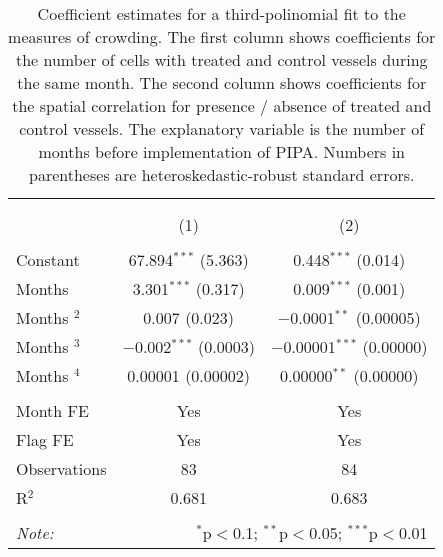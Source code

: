 
\begin{table}[!htbp] \centering 
  \caption{\label{tab:sp_corr}Coefficient estimates for a third-polinomial fit to the measures of crowding. The first column shows coefficients for the number of cells with treated and control vessels during the same month. The second column shows coefficients for the spatial correlation for presence / absence of treated and control vessels. The explanatory variable is the number of months before implementation of PIPA. Numbers in parentheses are heteroskedastic-robust standard errors.} 
  \label{} 
\footnotesize 
\begin{tabular}{@{\extracolsep{1pt}}lcc} 
\\[-1.8ex]\hline 
\hline \\[-1.8ex] 
\\[-1.8ex] & (1) & (2)\\ 
\hline \\[-1.8ex] 
 Constant & 67.894$^{***}$ (5.363) & 0.448$^{***}$ (0.014) \\ 
  Months & 3.301$^{***}$ (0.317) & 0.009$^{***}$ (0.001) \\ 
  Months $^2$ & 0.007 (0.023) & $-$0.0001$^{**}$ (0.00005) \\ 
  Months $^3$ & $-$0.002$^{***}$ (0.0003) & $-$0.00001$^{***}$ (0.00000) \\ 
  Months $^4$ & 0.00001 (0.00002) & 0.00000$^{**}$ (0.00000) \\ 
 \hline \\[-1.8ex] 
Month FE & Yes & Yes \\ 
Flag FE & Yes & Yes \\ 
Observations & 83 & 84 \\ 
R$^{2}$ & 0.681 & 0.683 \\ 
\hline 
\hline \\[-1.8ex] 
\textit{Note:}  & \multicolumn{2}{r}{$^{*}$p$<$0.1; $^{**}$p$<$0.05; $^{***}$p$<$0.01} \\ 
\end{tabular} 
\end{table} 
